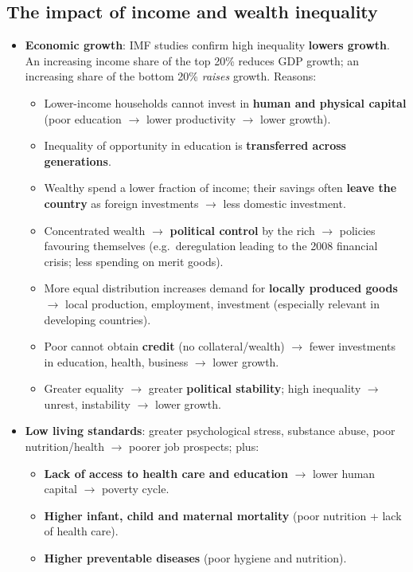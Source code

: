 \subsection{The impact of income and wealth inequality}
\begin{itemize}
  \item \textbf{Economic growth}: IMF studies confirm high inequality \textbf{lowers growth}. An increasing income share of the top 20\% reduces GDP growth; an increasing share of the bottom 20\% \textit{raises} growth. Reasons:
  \begin{itemize}
    \item Lower-income households cannot invest in \textbf{human and physical capital} (poor education $\to$ lower productivity $\to$ lower growth).
    \item Inequality of opportunity in education is \textbf{transferred across generations}.
    \item Wealthy spend a lower fraction of income; their savings often \textbf{leave the country} as foreign investments $\to$ less domestic investment.
    \item Concentrated wealth $\to$ \textbf{political control} by the rich $\to$ policies favouring themselves (e.g.\ deregulation leading to the 2008 financial crisis; less spending on merit goods).
    \item More equal distribution increases demand for \textbf{locally produced goods} $\to$ local production, employment, investment (especially relevant in developing countries).
    \item Poor cannot obtain \textbf{credit} (no collateral/wealth) $\to$ fewer investments in education, health, business $\to$ lower growth.
    \item Greater equality $\to$ greater \textbf{political stability}; high inequality $\to$ unrest, instability $\to$ lower growth.
  \end{itemize}
  \item \textbf{Low living standards}: greater psychological stress, substance abuse, poor nutrition/health $\to$ poorer job prospects; plus:
  \begin{itemize}
    \item \textbf{Lack of access to health care and education} $\to$ lower human capital $\to$ poverty cycle.
    \item \textbf{Higher infant, child and maternal mortality} (poor nutrition + lack of health care).
    \item \textbf{Higher preventable diseases} (poor hygiene and nutrition).

\end{itemize}
\end{itemize}
